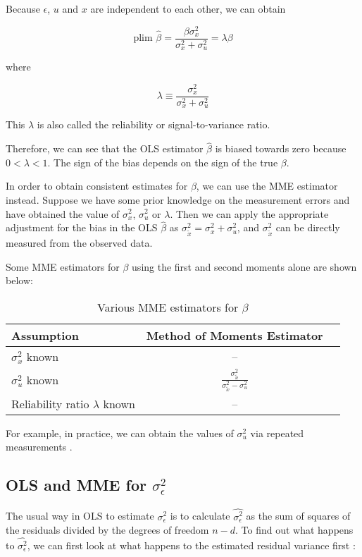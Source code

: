 \documentclass{article}
\begin{document}
Because $\epsilon$, $u$ and $x$ are independent to each other, we can obtain

\[
\textrm{plim } \hat{\beta} = \frac{\beta \sigma^2_x}{\sigma^2_x + \sigma^2_u} = \lambda \beta
\]

where

\[
\lambda \equiv \frac{\sigma_x^2}{\sigma_x^2 + \sigma_u^2}
\]

This $\lambda$ is also called the reliability or signal-to-variance ratio.

Therefore, we can see that the OLS estimator $\hat{\beta}$ is biased towards zero because $0 < \lambda < 1$. The sign of the bias depends on the sign of the true $\beta$.

In order to obtain consistent estimates for $\beta$, we can use the MME estimator instead. Suppose we have some prior knowledge on the measurement errors and have obtained the value of $\sigma_x^2$, $\sigma_u^2$ or $\lambda$. Then we can apply the appropriate adjustment for the bias in the OLS $\hat{\beta}$ as $\sigma^2_{\tilde{x}} = \sigma^2_x + \sigma^2_u$, and $\sigma^2_{\tilde{x}}$ can be directly measured from the observed data. 

Some MME estimators for $\beta$ using the first and second moments alone are shown below:

\begin{table}[ht]
    \centering
    \caption{Various MME estimators for $\beta$}
    \begin{tabular}[t]{lcc}
        \hline
        Assumption&Method of Moments Estimator\\
        \hline
        $\sigma_x^2$ known&--\\
        $\sigma_u^2$ known&$\frac{\sigma^2_{\tilde{x}}}{\sigma^2_{\tilde{x}} - \sigma^2_u}$\\
        Reliability ratio $\lambda$ known&--\\
        \hline
    \end{tabular}
\end{table}%

For example, in practice, we can obtain the values of $\sigma_u^2$ via repeated measurements \cite{mmereport}.

\subsection{OLS and MME for $\sigma_\epsilon^2$}

The usual way in OLS to estimate $\sigma_\epsilon^2$ is to calculate $\hat{\sigma^2_\epsilon}$ as the sum of squares of the residuals divided by the degrees of freedom $n-d$. To find out what happens to $\hat{\sigma^2_\epsilon}$, we can first look at what happens to the estimated residual variance first \cite{lecturenotes}:
\end{document}
